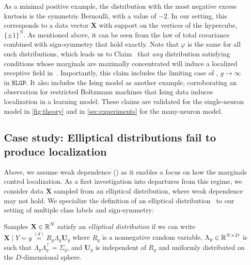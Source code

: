 As a minimal positive example, the distribution with the most negative excess kurtosis is the symmetric Bernoulli, with a value of $-2$.
In our setting, this corresponds to a data vector $\mathbf{X}$ with support on the vertices of the hypercube, $\{ \pm 1 \}^N$.
As mentioned above, it can be seen from the law of total covariance combined with sign-symmetry that  hold exactly. %
Note that $\varphi$ is the same for all such distributions, which leads us to Claim~ that \emph{any} distribution satisfying conditions  whose marginals are maximally concentrated will induce a localized receptive field in~.
Importantly, this claim includes the limiting case of \textcite{ingrosso2022data}, $g\to\infty$ in $\texttt{NLGP}$.
It also includes the Ising model as another example, corroborating an observation for restricted Boltzmann machines \cite{harsh2020placecell} that Ising data induces localization in a learning model.
These claims are validated for the single-neuron model in \cref{fig:theory} and in \cref{sec:experiments} for the many-neuron model.


\subsection{Case study: Elliptical distributions fail to produce localization}
\label{sub:elliptical}

Above, we assume weak dependence () as it enables a focus on how the marginals control localization.
As a first investigation into departures from this regime, we consider data $\mathbf{X}$ sampled from an elliptical distribution, where weak dependence may not hold.
We specialize the definition of an elliptical distribution~\parencite{frahm2004generalized} to our setting of multiple class labels and sign-symmetry:
\begin{definition}
    \label{def:elliptical}
    Samples $\mathbf{X} \in \operatorname{\mathbb{R}}^N$ satisfy an \emph{elliptical distribution} if we can write
    $\mathbf{X} \mid Y = y \overset{(d)}{=} R_y \Lambda_y \mathbf{U}_y$
    where $R_y$ is a nonnegative random variable, $\Lambda_y \in \operatorname{\mathbb{R}}^{N \times D}$ is such that $\Lambda_y \Lambda_y^\top = \Sigma_y$, and $\mathbf{U}_y$ is independent of $R_y$ and uniformly distributed on the $D$-dimensional sphere.
\end{definition}

